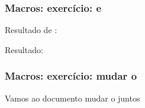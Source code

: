 \begin{frame}
  \frametitle{Macros: exercício: \latexcode{\email} e \latexcode{\todo}}
  \LARGE
  Resultado de \latexcode{\email}: 

  Resultado: 
\end{frame}

\begin{frame}
  \frametitle{Macros: exercício: mudar o \latexcode{\maketitle}}
  \LARGE
  Vamos ao documento mudar o \latexcode{\maketitle} juntos
\end{frame}
